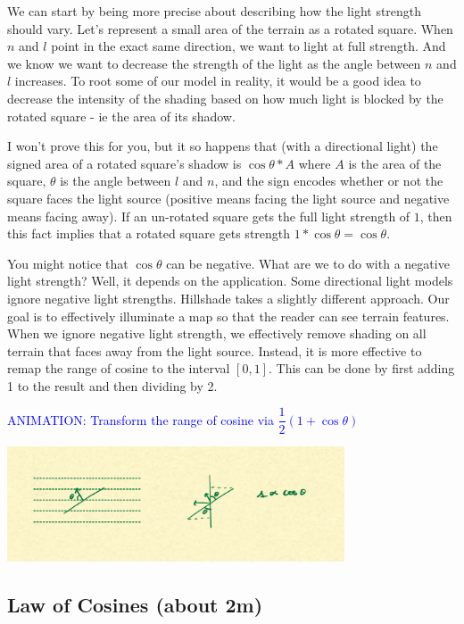 \documentclass{article}
\newcommand\animation[1]{\textcolor{blue}{ANIMATION: #1}}
\begin{document}
We can start by being more precise about describing how the light strength should vary.
Let's represent a small area of the terrain as a rotated square.
When $n$ and $l$ point in the exact same direction, we want to light at full strength.
And we know we want to decrease the strength of the light as the angle between $n$ and $l$ increases.
To root some of our model in reality, it would be a good idea to decrease the intensity of the shading based on how much light is blocked by the rotated square - ie the area of its shadow.

I won't prove this for you, but it so happens that (with a directional light) the signed area of a rotated square's shadow is $\cos \theta * A$ where $A$ is the area of the square, $\theta$ is the angle between $l$ and $n$, and the sign encodes whether or not the square faces the light source (positive means facing the light source and negative means facing away).
If an un-rotated square gets the full light strength of $1$, then this fact implies that a rotated square gets strength $1 * \cos \theta = \cos \theta$.

You might notice that $\cos \theta$ can be negative.
What are we to do with a negative light strength?
Well, it depends on the application.
Some directional light models ignore negative light strengths.
Hillshade takes a slightly different approach.
Our goal is to effectively illuminate a map so that the reader can see terrain features.
When we ignore negative light strength, we effectively remove shading on all terrain that faces away from the light source.
Instead, it is more effective to remap the range of cosine to the interval $[0, 1]$.
This can be done by first adding 1 to the result and then dividing by 2.
 
\animation{Transform the range of cosine via $\dfrac{1}{2}(1 + \cos \theta)$}

\begin{center}
	\includegraphics[width=0.75\textwidth,frame]{assets/cosine.jpg}
\end{center}

\subsection{Law of Cosines (about 2m)}
\end{document}
